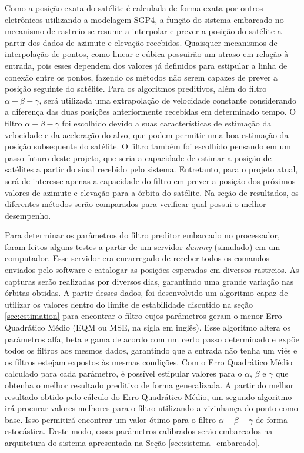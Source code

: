 Como a posição exata do satélite é calculada de forma exata por outros eletrônicos utilizando a modelagem SGP4, a função do sistema embarcado no mecanismo de rastreio se resume a interpolar e prever a posição do satélite a partir dos dados de azimute e elevação recebidos.
Quaisquer mecanismos de interpolação de pontos, como linear e cúbica possuirão um atraso em relação à entrada, pois esses dependem dos valores já definidos para estipular a linha de conexão entre os pontos, fazendo os métodos não serem capazes de prever a posição seguinte do satélite.
Para os algoritmos preditivos, além do filtro $\alpha-\beta-\gamma$, será utilizada uma extrapolação de velocidade constante considerando a diferença das duas posições anteriormente recebidas em determinado tempo.
O filtro $\alpha-\beta-\gamma$ foi escolhido devido a suas características de estimação da velocidade e da aceleração do alvo, que podem permitir uma boa estimação da posição subsequente do satélite.
O filtro também foi escolhido pensando em um passo futuro deste projeto, que seria a capacidade de estimar a posição de satélites a partir do sinal recebido pelo sistema.
Entretanto, para o projeto atual, será de interesse apenas a capacidade do filtro em prever a posição dos próximos valores de azimute e elevação para a órbita do satélite.
Na seção de resultados, os diferentes métodos serão comparados para verificar qual possui o melhor desempenho.

Para determinar os parâmetros do filtro preditor embarcado no processador, foram feitos alguns testes a partir de um servidor \textit{dummy} (simulado) em um computador. Esse servidor era encarregado de receber todos os comandos enviados pelo software e catalogar as posições esperadas em diversos rastreios.
As capturas serão realizadas por diversos dias, garantindo uma grande variação nas órbitas obtidas.
A partir desses dados, foi desenvolvido um algoritmo capaz de utilizar os valores dentro do limite de estabilidade discutido na seção \ref{sec:estimation} para encontrar o filtro cujos parâmetros geram o menor Erro Quadrático Médio (EQM ou MSE, na sigla em inglês).
Esse algoritmo altera os parâmetros alfa, beta e gama de acordo com um certo passo determinado e expõe todos os filtros aos mesmos dados, garantindo que a entrada não tenha um viés e os filtros estejam expostos às mesmas condições.
Com o Erro Quadrático Médio calculado para cada parâmetro, é possível estipular valores para o $\alpha$, $\beta$ e $\gamma$ que obtenha o melhor resultado preditivo de forma generalizada.
A partir do melhor resultado obtido pelo cálculo do Erro Quadrático Médio, um segundo algoritmo irá procurar valores melhores para o filtro utilizando a vizinhança do ponto como base. Isso permitirá encontrar um valor ótimo para o filtro $\alpha-\beta-\gamma$ de forma estocástica.
Deste modo, esses parâmetros calibrados serão embarcados na arquitetura do sistema apresentada na Seção \ref{sec:sistema_embarcado}.

